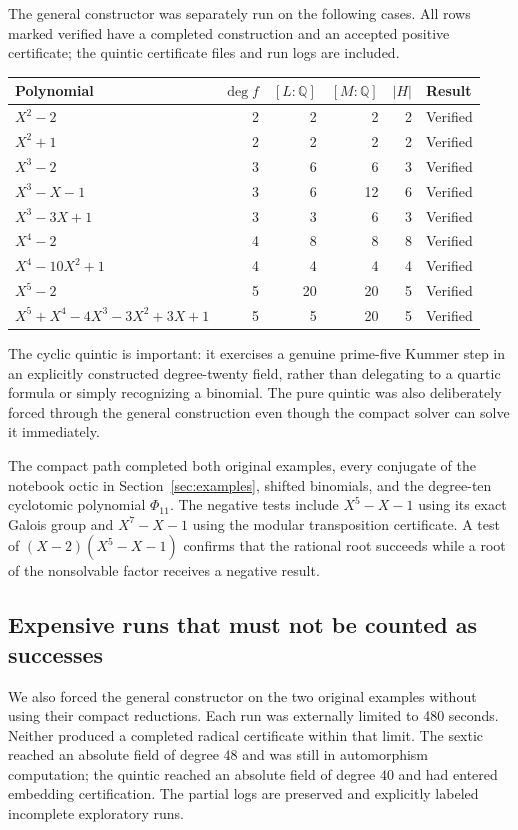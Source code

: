 \documentclass[11pt,letterpaper]{article}
\theoremstyle{definition}\newtheorem{definition}[theorem]{Definition}
\theoremstyle{remark}\newtheorem{remark}[theorem]{Remark}
\newcommand{\Q}{\mathbb Q}\newcommand{\C}{\mathbb C}\newcommand{\Z}{\mathbb Z}
\begin{document}
The general constructor was separately run on the following cases. All rows marked verified have a completed construction and an accepted positive certificate; the quintic certificate files and run logs are included.
\begin{center}
\begin{tabular}{lrrrrl}
\toprule
Polynomial & $\deg f$ & $[L:\Q]$ & $[M:\Q]$ & $|H|$ & Result\\\midrule
$X^2-2$ & 2 & 2 & 2 & 2 & Verified\\
$X^2+1$ & 2 & 2 & 2 & 2 & Verified\\
$X^3-2$ & 3 & 6 & 6 & 3 & Verified\\
$X^3-X-1$ & 3 & 6 & 12 & 6 & Verified\\
$X^3-3X+1$ & 3 & 3 & 6 & 3 & Verified\\
$X^4-2$ & 4 & 8 & 8 & 8 & Verified\\
$X^4-10X^2+1$ & 4 & 4 & 4 & 4 & Verified\\
$X^5-2$ & 5 & 20 & 20 & 5 & Verified\\
$X^5+X^4-4X^3-3X^2+3X+1$ & 5 & 5 & 20 & 5 & Verified\\
\bottomrule
\end{tabular}
\end{center}
The cyclic quintic is important: it exercises a genuine prime-five Kummer step in an explicitly constructed degree-twenty field, rather than delegating to a quartic formula or simply recognizing a binomial. The pure quintic was also deliberately forced through the general construction even though the compact solver can solve it immediately.

The compact path completed both original examples, every conjugate of the notebook octic in Section~\ref{sec:examples}, shifted binomials, and the degree-ten cyclotomic polynomial $\Phi_{11}$. The negative tests include $X^5-X-1$ using its exact Galois group and $X^7-X-1$ using the modular transposition certificate. A test of $(X-2)(X^5-X-1)$ confirms that the rational root succeeds while a root of the nonsolvable factor receives a negative result.

\subsection{Expensive runs that must not be counted as successes}
We also forced the general constructor on the two original examples without using their compact reductions. Each run was externally limited to 480 seconds. Neither produced a completed radical certificate within that limit. The sextic reached an absolute field of degree $48$ and was still in automorphism computation; the quintic reached an absolute field of degree $40$ and had entered embedding certification. The partial logs are preserved and explicitly labeled incomplete exploratory runs.
\end{document}
